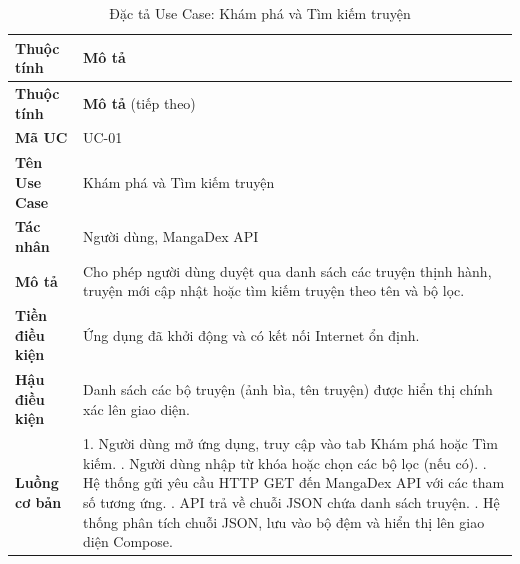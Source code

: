 \begin{longtable}{|p{3.5cm}|p{11.5cm}|}
    \caption{Đặc tả Use Case: Khám phá và Tìm kiếm truyện} \label{tab:uc_discover} \\
    \hline
    \textbf{Thuộc tính} & \textbf{Mô tả} \\ \hline
    \endfirsthead %

    \hline
    \textbf{Thuộc tính} & \textbf{Mô tả} (tiếp theo) \\ \hline
    \endhead %

    \textbf{Mã UC} & UC-01 \\ \hline
    \textbf{Tên Use Case} & Khám phá và Tìm kiếm truyện \\ \hline
    \textbf{Tác nhân} & Người dùng, MangaDex API \\ \hline
    \textbf{Mô tả} & Cho phép người dùng duyệt qua danh sách các truyện thịnh hành, truyện mới cập nhật hoặc tìm kiếm truyện theo tên và bộ lọc. \\ \hline
    \textbf{Tiền điều kiện} & Ứng dụng đã khởi động và có kết nối Internet ổn định. \\ \hline
    \textbf{Hậu điều kiện} & Danh sách các bộ truyện (ảnh bìa, tên truyện) được hiển thị chính xác lên giao diện. \\ \hline
    \textbf{Luồng cơ bản} & 
    1. Người dùng mở ứng dụng, truy cập vào tab Khám phá hoặc Tìm kiếm. \newline
    2. Người dùng nhập từ khóa hoặc chọn các bộ lọc (nếu có). \newline
    3. Hệ thống gửi yêu cầu HTTP GET đến MangaDex API với các tham số tương ứng. \newline
    4. API trả về chuỗi JSON chứa danh sách truyện. \newline
    5. Hệ thống phân tích chuỗi JSON, lưu vào bộ đệm và hiển thị lên giao diện Compose. \\ \hline
\end{longtable}



